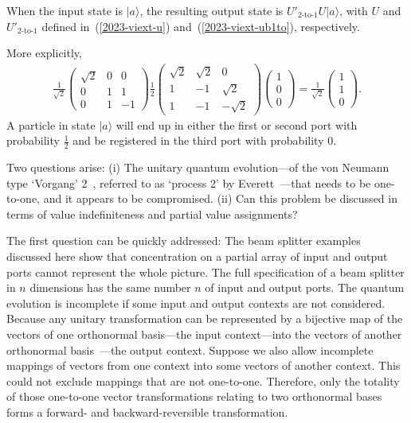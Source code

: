 \documentclass[%
 superscriptaddress,
  preprint,
 showpacs,
 showkeys,
 nofootinbib,
  amsmath,amssymb,
  aps,
 pra,
  longbibliography,
  floatfix,
 ]{revtex4-2}
\theoremstyle{definition}
\begin{document}
When the input state is $\vert a \rangle$, the resulting output state is  $U'_{\text{2-to-1}}U\vert a \rangle$, with $U$ and $U'_{\text{2-to-1}}$ defined in~(\ref{2023-viext-u}) and~(\ref{2023-viext-ub1to}), respectively.

More explicitly,
\begin{equation*}
\begin{split}
\frac{1}{\sqrt{2}}
\begin{pmatrix}
\sqrt{2}&0&0\\
0&1&1 \\
0&1&-1
\end{pmatrix}
%
 \frac12
\begin{pmatrix}
\sqrt{2} &  \sqrt{2}& 0\\
1& -1&  \sqrt{2} \\
1& -1& - \sqrt{2}
\end{pmatrix}
%
\begin{pmatrix}
1\\
0 \\
0
\end{pmatrix}
=
 \frac{1}{\sqrt{2}}
\begin{pmatrix}
1\\
1 \\
0
\end{pmatrix}
.
\end{split}
\end{equation*}
 A particle in state $\vert a \rangle$ will end up in either the first or second port with probability $\frac{1}{2}$ and be registered in the third port with probability 0.


Two questions arise:
(i)
The unitary quantum evolution---of the von Neumann type `Vorgang' 2~\cite{v-neumann-49,v-neumann-55}, referred to as `process 2' by Everett~\cite{everett}---that
needs to be one-to-one, and it appears to be compromised.
(ii)
Can this problem be discussed in terms of value indefiniteness and partial value assignments?


The first question can be quickly addressed:
The beam splitter examples discussed here show that concentration on a partial array of input and output ports cannot represent the whole picture.
The full specification of a beam splitter in $n$ dimensions has the same number $n$ of input and output ports.
The quantum evolution is incomplete if some input and output contexts are not considered.
Because any unitary transformation can be represented by a bijective map of the vectors
of one orthonormal basis---the input context---into the vectors of another orthonormal basis~\cite{Schwinger.60,Joglekar-I}---the output context.
Suppose we also allow incomplete mappings of vectors from one context into some vectors of another context. This could not exclude mappings that are not one-to-one. Therefore,
only the totality of those one-to-one vector transformations relating to two orthonormal bases forms a forward- and backward-reversible transformation.
\end{document}
